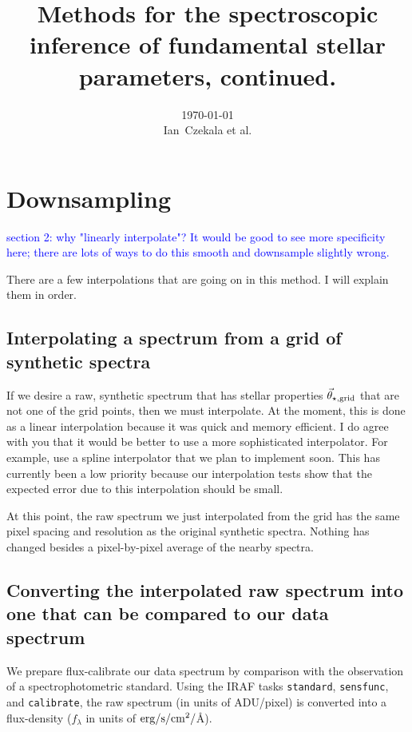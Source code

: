 \documentclass[preprint]{aastex} %
\newcommand{\vt}{\vec{\theta}}
\newcommand{\vg}{\vt_{\star, {\rm grid}}}
\newcommand{\hcom}[1]{ \textcolor{Blue}{#1}}
\begin{document}
\title{Methods for the spectroscopic inference of fundamental stellar parameters, continued.}
\author{\today{}\\
\medskip
Ian~Czekala et al.
}


\section{Downsampling}

\hcom{section 2: why "linearly interpolate"? It would be good to see more specificity here; there are lots of ways to do this smooth and downsample slightly wrong.}

There are a few interpolations that are going on in this method. I will explain them in order.

\subsection{Interpolating a spectrum from a grid of synthetic spectra}
If we desire a raw, synthetic spectrum that has stellar properties $\vg$ that are not one of the grid points, then we must interpolate. At the moment, this is done as a linear interpolation because it was quick and memory efficient. I do agree with you that it would be better to use a more sophisticated interpolator. For example, \citet{hwd+13} use a spline interpolator that we plan to implement soon. This has currently been a low priority because our interpolation tests show that the expected error due to this interpolation should be small. 

At this point, the raw spectrum we just interpolated from the grid has the same pixel spacing and resolution as the original synthetic spectra. Nothing has changed besides a pixel-by-pixel average of the nearby spectra.

\subsection{Converting the interpolated raw spectrum into one that can be compared to our data spectrum}

We prepare flux-calibrate our data spectrum by comparison with the observation of a spectrophotometric standard. Using the IRAF tasks \texttt{standard}, \texttt{sensfunc}, and \texttt{calibrate}, the raw spectrum (in units of ADU/pixel) is converted into a flux-density ($f_\lambda$ in units of ${\rm erg}/{\rm s}/{\rm cm}^2/$\AA). 
\end{document}
